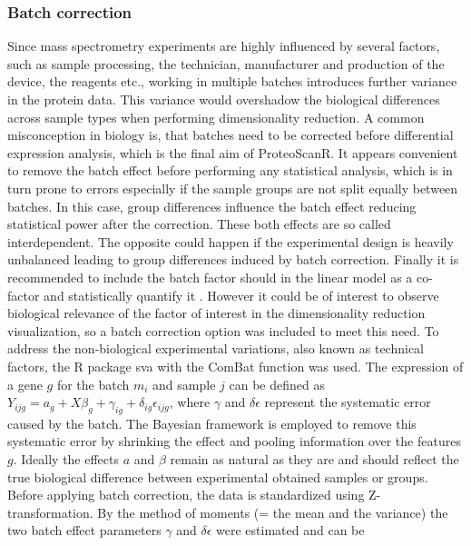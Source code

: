 \documentclass[
  11pt,
]{article}
\begin{document}
\hypertarget{batch-correction}{%
\subsubsection{Batch correction}\label{batch-correction}}

Since mass spectrometry experiments are highly influenced by several
factors, such as sample processing, the technician, manufacturer and
production of the device, the reagents etc., working in multiple batches
introduces further variance in the protein data. This variance would
overshadow the biological differences across sample types when
performing dimensionality reduction. A common misconception in biology
is, that batches need to be corrected before differential expression
analysis, which is the final aim of ProteoScanR. It appears convenient
to remove the batch effect before performing any statistical analysis,
which is in turn prone to errors especially if the sample groups are not
split equally between batches. In this case, group differences influence
the batch effect reducing statistical power after the correction. These
both effects are so called interdependent. The opposite could happen if
the experimental design is heavily unbalanced leading to group
differences induced by batch correction. Finally it is recommended to
include the batch factor should in the linear model as a co-factor and
statistically quantify it \citep{Nygaard2016}. However it could be of
interest to observe biological relevance of the factor of interest in
the dimensionality reduction visualization, so a batch correction option
was included to meet this need. To address the non-biological
experimental variations, also known as technical factors, the R package
sva \citep{Leek2012} with the ComBat function \citep{Johnson2007} was
used. The expression of a gene \(g\) for the batch \(m_i\) and sample
\(j\) can be defined as
\(Y_{ijg} = a_{g} + X\beta_{g} + \gamma_{ig} + \delta_{ig}\epsilon_{ijg}\),
where \(\gamma\) and \(\delta\epsilon\) represent the systematic error
caused by the batch. The Bayesian framework is employed to remove this
systematic error by shrinking the effect and pooling information over
the features \(g\). Ideally the effects \(a\) and \(\beta\) remain as
natural as they are and should reflect the true biological difference
between experimental obtained samples or groups. Before applying batch
correction, the data is standardized using Z-transformation. By the
method of moments (= the mean and the variance) the two batch effect
parameters \(\gamma\) and \(\delta\epsilon\) were estimated and can be
\end{document}
